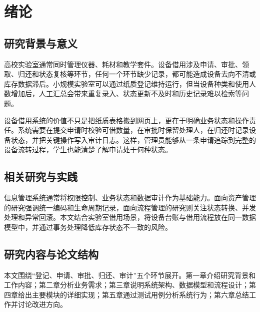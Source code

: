 \chapter{绪论}
\section{研究背景与意义}
高校实验室通常同时管理仪器、耗材和教学套件。设备借用涉及申请、审批、领取、归还和状态复核等环节，任何一个环节缺少记录，都可能造成设备去向不清或库存数据滞后。小规模实验室可以通过纸质登记维持运行，但当设备种类和使用人数增加后，人工汇总会带来重复录入、状态更新不及时和历史记录难以检索等问题。

设备借用系统的价值不只是把纸质表格搬到网页上，更在于明确业务状态和操作责任。系统需要在提交申请时校验可借数量，在审批时保留处理人，在归还时记录设备状态，并把关键操作写入审计日志。这样，管理员能够从一条申请追踪到完整的设备流转过程，学生也能清楚了解申请处于何种状态。
\section{相关研究与实践}
信息管理系统通常将权限控制、业务状态和数据审计作为基础能力。面向资产管理的研究强调统一编码和生命周期记录，面向流程管理的研究则关注状态转换、并发处理和异常回滚。本文结合实验室借用场景，将设备台账与借用流程放在同一数据模型中，并通过事务处理降低库存状态不一致的风险\cite{ref2}。
\section{研究内容与论文结构}
本文围绕“登记、申请、审批、归还、审计”五个环节展开。第一章介绍研究背景和工作内容；第二章分析业务需求；第三章说明系统架构、数据模型和流程设计；第四章给出主要模块的详细实现；第五章通过测试用例分析系统行为；第六章总结工作并讨论改进方向。

